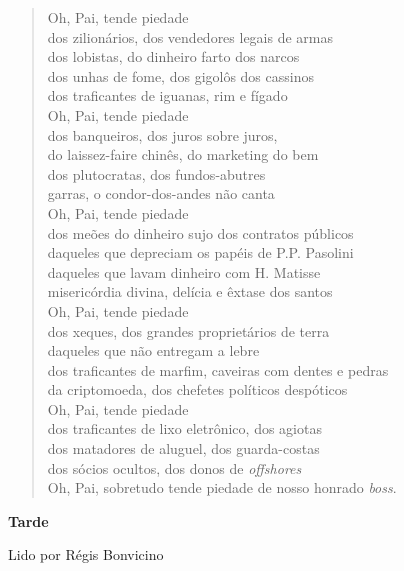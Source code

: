 \begin{verse}
Oh, Pai, tende piedade\\
dos zilionários, dos vendedores legais de armas\\
dos lobistas, do dinheiro farto dos narcos\\
dos unhas de fome, dos gigolôs dos cassinos\\
dos traficantes de iguanas, rim e fígado\\[5pt]
Oh, Pai, tende piedade\\
dos banqueiros, dos juros sobre juros,\\
do laissez-faire chinês, do marketing do bem\\
dos plutocratas, dos fundos-abutres\\
garras, o condor-dos-andes não canta\\[5pt]
Oh, Pai, tende piedade\\
dos meões do dinheiro sujo dos contratos públicos\\
daqueles que depreciam os papéis de P.P. Pasolini\\
daqueles que lavam dinheiro com H. Matisse\\
misericórdia divina, delícia e êxtase dos santos\\[5pt]
Oh, Pai, tende piedade\\
dos xeques, dos grandes proprietários de terra\\
daqueles que não entregam a lebre\\
dos traficantes de marfim, caveiras com dentes e pedras\\
da criptomoeda, dos chefetes políticos despóticos\\[5pt]
Oh, Pai, tende piedade\\
dos traficantes de lixo eletrônico, dos agiotas\\
dos matadores de aluguel, dos guarda-costas\\
dos sócios ocultos, dos donos de \emph{offshores}\\
Oh, Pai, sobretudo tende piedade de nosso honrado \emph{boss}.
\end{verse}

\pagebreak

\textbf{Tarde}

Lido por Régis Bonvicino

